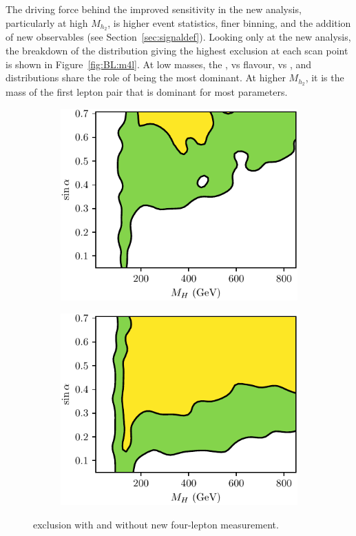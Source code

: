 The driving force behind the improved sensitivity in the new \mFourL{} analysis, particularly at high $M_{h_2}$, is higher event statistics, finer binning, and the addition of new observables (see Section~\ref{sec:signaldef}). Looking only at the new \mFourL{} analysis, the breakdown of the distribution giving the highest exclusion at each scan point is shown in Figure~\ref{fig:BL:m4l}. At low masses, the \dPhill, \mFourL{} vs flavour, \mFourL{} vs \yFourL, and \ptZOne distributions share the role of being the most dominant. At higher $M_{h_2}$, it is the mass of the first lepton pair \mZOne that is dominant for most parameters. 
\begin{figure}[tbp]
    \begin{subfigure}{.45\textwidth}\centering
      \includegraphics[width=.99\linewidth]{Figures/BL/BL-ATLAS_13_4LLevels_old.pdf} \caption{}\label{fig:BL:4lold}
    \end{subfigure}
        \begin{subfigure}{.45\textwidth}\centering
      \includegraphics[width=.99\linewidth]{Figures/BL/BL-ATLAS_13_4LLevels.pdf}\caption{}\label{fig:BL:4lnew}
    \end{subfigure}
    \caption{\contur exclusion with and without new four-lepton measurement.}
    \label{fig:BL:4l}
\end{figure}
